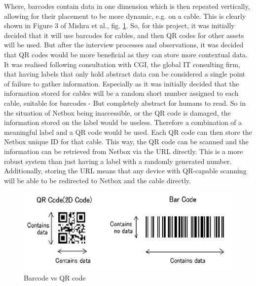 \documentclass [11pt,a4paper]{article}
\begin{document}
Where, barcodes contain data in one dimension which is then repeated vertically, allowing for their placement to be more dynamic, e.g. on a cable. This is clearly shown in Figure 3 of Mishra et al., fig. \ref{fig:barcode}. So, for this project, it was initially decided that it will use barcodes for cables, and then QR codes for other assets will be used. But after the interview processes and observations, it was decided that QR codes would be more beneficial as they can store more contextual data. It was realised following consultation with CGI, the global IT consulting firm, that having labels that only hold abstract data can be considered a single point of failure to gather information. Especially as it was initially decided that the information stored for cables will be a random short number assigned to each cable, suitable for barcodes - But completely abstract for humans to read. So in the situation of Netbox being inaccessible, or the QR code is damaged, the information stored on the label would be useless. Therefore a combination of a meaningful label and a QR code would be used. Each QR code can then store the Netbox unique ID for that cable. This way, the QR code can be scanned and the information can be retrieved from Netbox via the URL directly. This is a more robust system than just having a label with a randomly generated number. Additionally, storing the URL means that any device with QR-capable scanning  will be able to be redirected to Netbox and the cable directly.

\begin{figure}[H]
\centering
\includegraphics[width=.50\textwidth]{images/barcode_mishra.png}
\caption{Barcode vs QR code}
\label{fig:barcode}
\end{figure}
\end{document}
